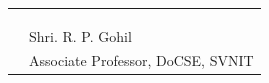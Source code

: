 \documentclass[10pt a4paper twoside]{report}
\begin{document}






\begin{center}
\begin{tabular}{@{}p{.5in}p{4in}@{}}
& \hfill \\
& \hfill \\
& \hrulefill \\
& Shri. R. P. Gohil \\
& Associate Professor, DoCSE, SVNIT\\
\end{tabular}
\end{center}
\end{document}

